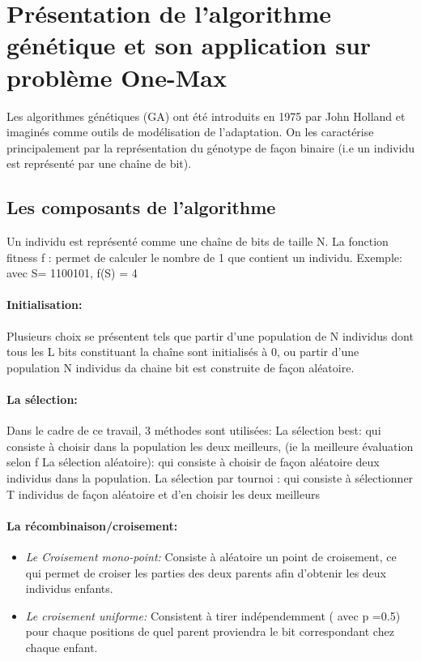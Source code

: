 \documentclass{article}
\begin{document}
\section{Présentation de l'algorithme génétique et son application sur problème One-Max}

Les algorithmes génétiques (GA) ont été introduits en 1975 par John Holland et imaginés comme outils de modélisation de l'adaptation. On les caractérise principalement par la représentation du génotype de façon binaire (i.e un individu est représenté par une chaîne de bit).

\subsection{Les composants de l'algorithme}

Un individu est représenté comme une chaîne de bits de taille N.
La fonction fitness f : permet de calculer le nombre de 1 que contient un individu. Exemple: avec S= 1100101, f(S) = 4
	
\paragraph{Initialisation:}
Plusieurs choix se présentent tels que partir d'une population de N individus dont tous les L bits constituant la chaîne sont initialisés à 0, ou partir d'une population N individus da chaine bit est construite de façon aléatoire.
\paragraph{La sélection:}
Dans le cadre de ce travail, 3 méthodes sont utilisées: 
La sélection best: qui consiste à choisir dans la population les deux meilleurs, (ie la meilleure évaluation selon f
La sélection aléatoire): qui consiste à choisir de façon aléatoire deux individus dans la population.
La sélection par tournoi : qui consiste à sélectionner T individus de façon aléatoire et d'en choisir les deux meilleurs

\paragraph{La récombinaison/croisement:}
\begin{itemize}
    \item \emph{Le Croisement mono-point:} Consiste à aléatoire un point de croisement, ce qui permet de croiser les parties des deux parents afin d'obtenir les deux individus enfants.
    \item \emph{Le croisement uniforme:} Consistent à tirer indépendemment ( avec p =0.5) pour chaque positions de quel parent proviendra le bit correspondant chez chaque enfant.
\end{itemize}
\end{document}
